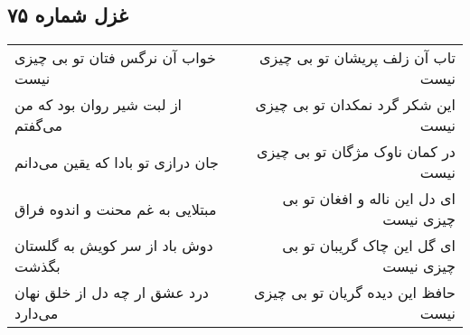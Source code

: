 \begin{center}
\section*{غزل شماره ۷۵}
\label{sec:sh075}
\begin{longtable}{l p{0.5cm} r}
خواب آن نرگس فتان تو بی چیزی نیست
&&
تاب آن زلف پریشان تو بی چیزی نیست
\\
از لبت شیر روان بود که من می‌گفتم
&&
این شکر گرد نمکدان تو بی چیزی نیست
\\
جان درازی تو بادا که یقین می‌دانم
&&
در کمان ناوک مژگان تو بی چیزی نیست
\\
مبتلایی به غم محنت و اندوه فراق
&&
ای دل این ناله و افغان تو بی چیزی نیست
\\
دوش باد از سر کویش به گلستان بگذشت
&&
ای گل این چاک گریبان تو بی چیزی نیست
\\
درد عشق ار چه دل از خلق نهان می‌دارد
&&
حافظ این دیده گریان تو بی چیزی نیست
\\
\end{longtable}
\end{center}
